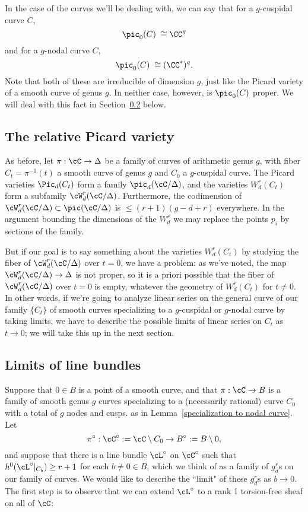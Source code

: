 In the case of the curves we'll be dealing with, we can say that for a $g$-cuspidal curve $C$,
$$
\pic_0(C) \; \cong \CC^g
$$
and for a $g$-nodal curve $C$, 
$$
\pic_0(C) \; \cong (\CC^*)^g.
$$
Note that both of these are irreducible of dimension $g$, just like the Picard variety of a smooth curve of genus $g$. In neither case, however, is $\pic_0(C)$ proper. We will deal with this fact in Section~\ref{line bundle limits} below.

\subsection{The relative Picard variety}

As before, let $\pi : \cC \to \Delta$ be a family of curves of arithmetic genus $g$, with fiber $C_t = \pi^{-1}(t)$ a smooth curve of genus $g$ and $C_0$ a $g$-cuspidal curve. The Picard varieties $\Pic_d(C_t)$ form a family $\pic_d(\cC/\Delta)$, and the varieties $W^r_d(C_t)$ form a subfamily $\cW^r_d(\cC/\Delta)$. Furthermore, the codimension of $\cW^r_d(\cC/\Delta) \subset \pic(\cC/\Delta)$ is $\leq (r+1)(g-d+r)$ everywhere. In the argument bounding  the dimensions of the $W^r_d$
we may replace the points $p_i$ by sections of the family.

But if our goal is to say something about the varieties $W^r_d(C_t)$ by studying the fiber of $\cW^r_d(\cC/\Delta)$ over $t=0$, we have a problem: as we've noted, the map $\cW^r_d(\cC/\Delta) \to \Delta$ is not proper, so it is a priori possible that the fiber of $\cW^r_d(\cC/\Delta)$ over $t=0$ is empty, whatever the geometry of $W^r_d(C_t)$ for $t \neq 0$. In other words,  if we're going to analyze linear series on the general curve of our family $\{C_t\}$ of smooth curves specializing to a $g$-cuspidal or $g$-nodal curve by taking limits, we have to describe the possible limits of linear series on $C_t$ as $t\to 0$; we will take this up in the next section.


\subsection{Limits of line bundles}\label{line bundle limits}


Suppose that $0\in B$ is a point of a smooth curve, and that  $\pi : \cC \to B$ is a family of smooth genus $g$ curves specializing to a (necessarily rational) curve $C_0$ with a total of $g$  nodes and cusps. as in Lemma~\ref{specialization to nodal curve}. 
 Let 
$$
\pi^\circ: \cC^\circ := \cC \setminus C_0\to B^\circ := B\setminus 0,
$$
and suppose that there is a line bundle $\cL^\circ$ on $\cC^\circ$ such that $h^0(\cL^\circ|_{C_b}) \geq r+1$ for each $b \neq 0 \in B$, which we think of as a family of $g^r_d$s on our family of curves. We would like to describe the ``limit" of these $g^r_d$s as $b \to 0$. The first step is to observe that
we can extend $\cL^\circ$  to a rank 1 torsion-free sheaf on all of $\cC$:


